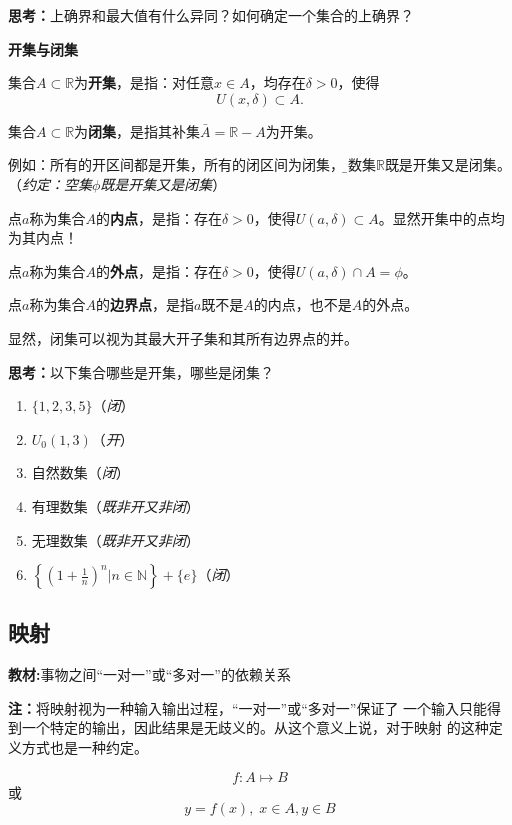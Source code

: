 	{\bf 思考：}上确界和最大值有什么异同？如何确定一个集合的上确界？
	
	\begin{shaded}
	{\bf 开集与闭集}
	
	集合$A\subset\mathbb{R}$为{\bf 开集}，是指：对任意$x\in A$，均存在$\delta>0$，使得
	$$U(x,\delta)\subset A.$$
	
	集合$A\subset\mathbb{R}$为{\bf 闭集}，是指其补集$\bar{A}=\mathbb{R}-A$为开集。
	
	例如：所有的开区间都是开集，所有的闭区间为闭集，{\b 实数集$\mathbb{R}$既是开集又是闭集}。
	（{\it 约定：空集$\phi$既是开集又是闭集}）
	
	点$a$称为集合$A$的{\bf 内点}，是指：存在$\delta>0$，使得$U(a,\delta)\subset A$。显然开集中的点均为其内点！
	
	点$a$称为集合$A$的{\bf 外点}，是指：存在$\delta>0$，使得$U(a,\delta)\cap A=\phi$。
	
	点$a$称为集合$A$的{\bf 边界点}，是指$a$既不是$A$的内点，也不是$A$的外点。
	
	显然，闭集可以视为其最大开子集和其所有边界点的并。
	
	{\bf 思考：}以下集合哪些是开集，哪些是闭集？
	\begin{enumerate}[(1)]
	  \setlength{\itemindent}{1cm}
	  \item $\{1,2,3,5\}$\quad\quad（{\it 闭}）
	  \item $U_0(1,3)$\quad\quad（{\it 开}）
	  \item 自然数集\quad\quad（{\it 闭}）
	  \item 有理数集\quad\quad（{\it 既非开又非闭}）
	  \item 无理数集\quad\quad（{\it 既非开又非闭}）
	  \item $\left\{\left(1+\frac
	  1n\right)^n|n\in\mathbb{N}\right\}+\{e\}$\quad\quad（{\it 闭}）
	\end{enumerate}
	
	\end{shaded}

\subsection{映射}

{\bf 教材:}事物之间“一对一”或“多对一”的依赖关系

{\bf 注：}将映射视为一种输入输出过程，“一对一”或“多对一”保证了
一个输入只能得到一个特定的输出，因此结果是无歧义的。从这个意义上说，对于映射
的这种定义方式也是一种约定。

$$f:A\mapsto B$$
或
$$y=f(x),\;x\in A,y\in B$$

